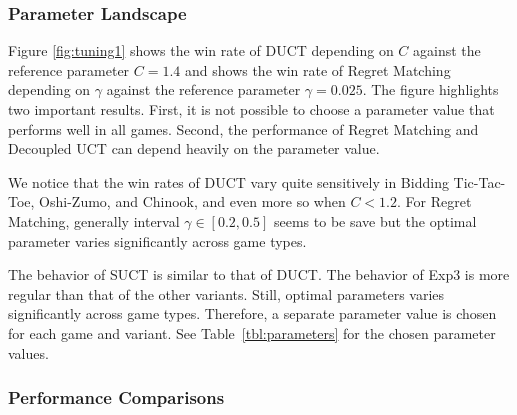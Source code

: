 \documentclass[conference]{IEEEtran}
\begin{document}
\subsubsection{Parameter Landscape}

Figure \ref{fig:tuning1} shows the win rate of DUCT depending on $C$ against the reference parameter $C=1.4$ and 
shows the win rate of Regret Matching depending on $\gamma$ against the reference parameter $\gamma = 0.025$. The figure 
highlights two important results. First, it is not possible to choose a parameter value that performs well in all games. 
Second, the performance of Regret Matching and Decoupled UCT can depend heavily on the parameter value. 

We notice that the win rates of DUCT vary quite sensitively in Bidding Tic-Tac-Toe, Oshi-Zumo, and Chinook, and even more so when $C < 1.2$. 
For Regret Matching, generally interval $\gamma \in [0.2,0.5]$ seems to be save but the optimal parameter varies significantly across game types.

The behavior of SUCT is similar to that of DUCT. The behavior of Exp3 is more regular than that of the other variants. 
Still, optimal parameters varies significantly across game types. Therefore, a separate parameter value is chosen 
for each game and variant. See Table~\ref{tbl:parameters} for the chosen parameter values.


\subsubsection{Performance Comparisons}
\end{document}
